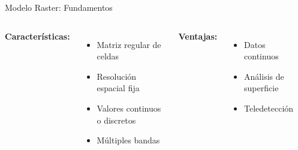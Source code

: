 \documentclass[10pt,aspectratio=169]{beamer}
\begin{document}
\begin{frame}{Modelo Raster: Fundamentos}
    \begin{columns}[T]
        \textbf{Características:}
        \begin{itemize}
            \item Matriz regular de celdas
            \item Resolución espacial fija
            \item Valores continuos o discretos
            \item Múltiples bandas
        \end{itemize}
        
        \vspace{0.3cm}
        \textbf{Ventajas:}
        \begin{itemize}
            \item Datos continuos
            \item Análisis de superficie
            \item Teledetección
        \end{itemize}
        
        \begin{center}
        \end{center}
    \end{columns}
\end{frame}
\end{document}
